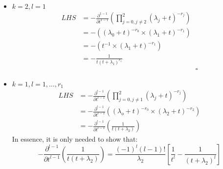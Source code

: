 \begin{itemize}
    \item \(k = 2, l = 1\)
    \begin{equation*}
        \begin{split}
            LHS &= - \frac{\partial^{1-1}}{\partial t^{1-1}} 
            \left( \prod_{j=0, j \neq 2}^{2} (\lambda_j + t)^{-r_j} \right) \\
            &=-\left( (\lambda_0 + t)^{-r_0} \times (\lambda_1 + t)^{-r_1} \right) \\
            &=-\left( t^{-1} \times (\lambda_1 + t)^{-r_1} \right) \\ 
            &= - \frac{1}{t(t + \lambda_1)^{r_1}} \\
            & \hspace{7cm} \square
        \end{split}
    \end{equation*}
    \item \(k = 1, l = 1, \dots, r_1\)
    \begin{equation*}
        \begin{split}
            LHS &= -\frac{\partial^{l-1}}{\partial t^{l-1}} 
            \left( \prod_{j=0, j \neq 1}^{2} (\lambda_j + t)^{-r_j} \right) \\
            &= -\frac{\partial^{l-1}}{\partial t^{l-1}}
            \left( (\lambda_o + t)^{-r_0} \times (\lambda_2 + t)^{-r_2} \right) \\
            &= -\frac{\partial^{l-1}}{\partial t^{l-1}}
            \left( \frac{1}{t(t + \lambda_2)}\right)
        \end{split}
    \end{equation*}
    In essence, it is only needed to show that:
    \[-\frac{\partial^{l-1}}{\partial t^{l-1}} 
    \left( \frac{1}{t(t + \lambda_2)}\right) = \frac{(-1)^{l} (l-1)!}{\lambda_2}
    \left[\frac{1}{t^l} - \frac{1}{(t + \lambda_2)^l}\right]\]
    

\end{itemize}
